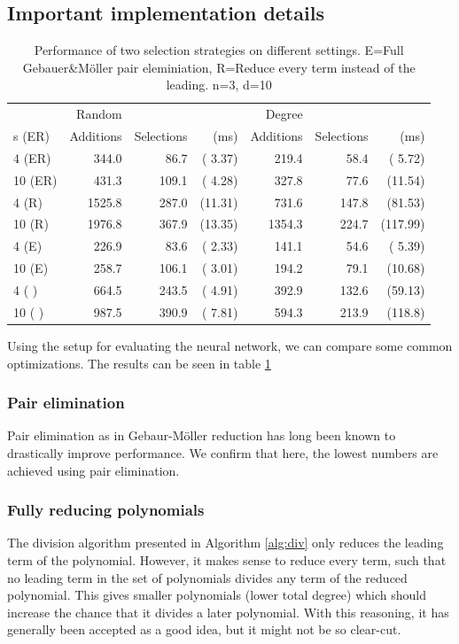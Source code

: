 \documentclass{article}
\theoremstyle{changedot}
\theoremstyle{changedotbreak}
\theoremstyle{nonumberplain}
\begin{document}
\subsection{Important implementation details}
\begin{table}[h]
  \begin{tabular}{l|rrr|rrr}
                 & Random & &             & Degree & & \\
    s   (ER) & Additions & Selections & (ms) & Additions & Selections & (ms) \\ \hline
    4 \hfill  (ER) &  344.0& 86.7 & ( 3.37) &  219.4& 58.4 & ( 5.72) \\
    10 \hfill  (ER) &  431.3&109.1 & ( 4.28) &  327.8& 77.6 & (11.54) \\
    4 \hfill   (R) & 1525.8&287.0 & (11.31) &  731.6&147.8 & (81.53) \\
    10 \hfill  (R) & 1976.8&367.9 & (13.35) & 1354.3&224.7 & (117.99) \\
    4 \hfill   (E) &  226.9& 83.6 & ( 2.33) &  141.1& 54.6 & ( 5.39) \\
    10 \hfill  (E) &  258.7&106.1 & ( 3.01) &  194.2& 79.1 & (10.68) \\
    4 \hfill   (  ) &  664.5&243.5 & ( 4.91) &  392.9&132.6 & (59.13) \\
    10 \hfill  (  ) &  987.5&390.9 & ( 7.81) &  594.3&213.9 & (118.8)
  \end{tabular}
  \caption{Performance of two selection strategies on different settings. E=Full Gebauer\&Möller pair eleminiation, R=Reduce every term instead of the leading. n=3, d=10}
  \label{tab:imp_details}
\end{table}

Using the setup for evaluating the neural network, we can compare some common optimizations. The results can be seen in table \ref{tab:imp_details}

\subsubsection{Pair elimination}
Pair elimination as in Gebaur-Möller reduction has long been known to drastically improve performance. We confirm that here, the lowest numbers are achieved using pair elimination.



\subsubsection{Fully reducing polynomials}
The division algorithm presented in Algorithm \ref{alg:div} only reduces the leading term of the polynomial. However, it makes sense to reduce every term, such that no leading term in the set of polynomials divides any term of the reduced polynomial. This gives smaller polynomials (lower total degree) which should increase the chance that it divides a later polynomial. With this reasoning, it has generally been accepted as a good idea, but it might not be so clear-cut.
\end{document}

